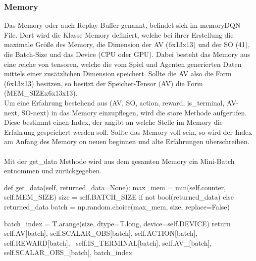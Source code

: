 \subsubsection{Memory} \label{sec:Implementierung_Memory}
Das Memory oder auch Replay Buffer genannt, befindet sich im memoryDQN File. Dort wird die Klasse Memory definiert, welche bei ihrer Erstellung die maximale Größe des Memory, die Dimension der AV (6x13x13) und der SO (41), die Batch-Size und das Device (CPU oder GPU).
Dabei besteht das Memory aus eine reiche von tensoren, welche die vom Spiel und Agenten generierten Daten mittels einer zusätzlichen Dimension speichert.
Sollte die AV also die Form (6x13x13) besitzen, so besitzt der Speicher-Tensor (AV) die Form (MEM\_SIZEx6x13x13).\\
Um eine Erfahrung bestehend aus (AV, SO, action, reward, is\_terminal, AV-next, SO-next) in das Memory einzupflegen, wird die store Methode aufgerufen. Diese bestimmt einen Index, der angibt an welche Stelle im Memory die Erfahrung gespeichert werden soll. Sollte das Memory voll sein, so wird der Index am Anfang des Memory on neuen beginnen und alte Erfahrungen überschreiben.\\
\\Mit der get\_data Methode wird aus dem gesamten Memory ein Mini-Batch entnommen und zurückgegeben.
\begin{python}
	def get_data(self, returned_data=None):
		max_mem = min(self.counter, self.MEM_SIZE)
		size = self.BATCH_SIZE if not bool(returned_data) else returned_data
		batch = np.random.choice(max_mem, size, replace=False)
		
		batch_index = T.arange(size, dtype=T.long, device=self.DEVICE)
		return self.AV[batch], self.SCALAR_OBS[batch], self.ACTION[batch], self.REWARD[batch], \
			   self.IS_TERMINAL[batch], self.AV_[batch], self.SCALAR_OBS_[batch], batch_index
\end{python}

